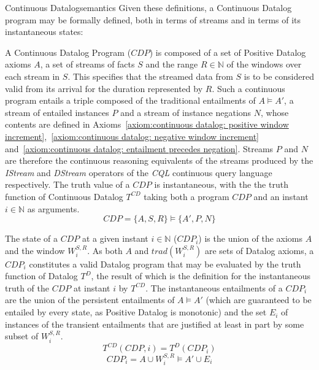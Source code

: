 \begin{nestedsection}{Continuous Datalog}{semantics}
	Given these definitions, a Continuous Datalog program may be formally defined, both in terms of streams and in terms of its instantaneous states:

	\begin{definition}\label{def:continuous datalog: CDP}
		A Continuous Datalog Program (${CDP}$) is composed of a set of Positive Datalog axioms $A$, a set of streams of facts $S$ and the range ${R \in \mathbb{N}}$ of the windows over each stream in $S$.
		This specifies that the streamed data from $S$ is to be considered valid from its arrival for the duration represented by $R$.
		Such a continuous program entails a triple composed of the traditional entailments of ${A \vDash A'}$, a stream of entailed instances $P$ and a stream of instance negations $N$, whose contents are defined in Axioms~\ref{axiom:continuous datalog: positive window increment},~\ref{axiom:continuous datalog: negative window increment} and~\ref{axiom:continuous datalog: entailment precedes negation}.
		Streams $P$ and $N$ are therefore the continuous reasoning equivalents of the streams produced by the \emph{IStream} and \emph{DStream} operators of the \emph{CQL} continuous query language \citep{CQL} respectively.
		The truth value of a ${CDP}$ is instantaneous, with the the truth function of Continuous Datalog $T^{CD}$ taking both a program ${CDP}$ and an instant ${i \in \mathbb{N}}$ as arguments.
		\begin{equation*}
			CDP = \{A,S,R\} \vDash \{A',P,N\}
		\end{equation*}
	\end{definition}

	\begin{definition}\label{def:continuous datalog: CDPt}
		The state of a ${CDP}$ at a given instant ${i \in \mathbb{N}}$ (${CDP_{i}}$) is the union of the axioms $A$ and the window $W^{S,R}_{i}$.
		As both $A$ and ${trad\left( W^{S,R}_{i} \right)}$ are sets of Datalog axioms, a ${CDP_{i}}$ constitutes a valid Datalog program that may be evaluated by the truth function of Datalog $T^{D}$, the result of which is the definition for the instantaneous truth of the ${CDP}$ at instant $i$ by $T^{CD}$.
		The instantaneous entailments of a $CDP_{i}$ are the union of the persistent entailments of ${A \vDash A'}$ (which are guaranteed to be entailed by every state, as Positive Datalog is monotonic) and the set $E_{i}$ of instances of the transient entailments that are justified at least in part by some subset of $W^{S,R}_{i}$.
		\begin{equation*}
			T^{CD} \left( CDP, i \right) = T^{D} \left( CDP_{i} \right)
		\end{equation*}
		\begin{equation*}
			CDP_{i} = A \cup W^{S,R}_{i} \vDash A' \cup E_{i}
		\end{equation*}
	\end{definition}



\end{nestedsection}
